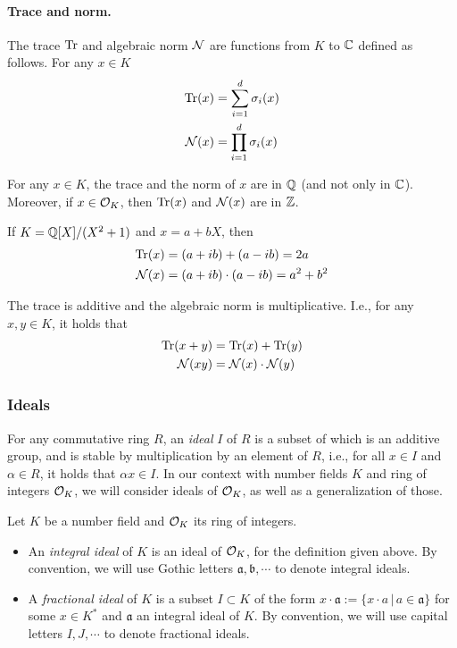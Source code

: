 \paragraph{Trace and norm.} The trace $\mathrm{Tr}$ and algebraic norm $\mathcal{N}$ are functions from $K$ to $\mathbb{C}$ defined as follows. For any $x \in K$
\begin{align*}
\mathrm{Tr}(x) &= \sum_{i = 1}^d \sigma_i(x) \\
\mathcal{N}(x) &= \prod_{i = 1}^d \sigma_i(x)
\end{align*}
\begin{lemma}
For any $x \in K$, the trace and the norm of $x$ are in $\mathbb{Q}$ (and not only in $\mathbb{C}$). Moreover, if $x \in \mathcal{O}_K$, then $\mathrm{Tr}(x)$ and $\mathcal{N}(x)$ are in $\mathbb{Z}$.
\end{lemma}

\begin{example}
If $K = \mathbb{Q}[X]/(X^2+1)$ and $x = a+bX$, then
\begin{align*}
\mathrm{Tr}(x) &= (a+ib) + (a-ib) = 2a \\
\mathcal{N}(x) &= (a+ib) \cdot (a-ib) = a^2+b^2
\end{align*}
\end{example}

\begin{lemma}
The trace is additive and the algebraic norm is multiplicative. I.e., for any $x, y \in K$, it holds that
\begin{align*}
\mathrm{Tr}(x+y) &= \mathrm{Tr}(x) + \mathrm{Tr}(y) \\
\mathcal{N}(xy) &= \mathcal{N}(x) \cdot \mathcal{N}(y)
\end{align*}
\end{lemma}

\subsubsection{Ideals} For any commutative ring $R$, an \emph{ideal} $I$ of $R$ is a subset of which is an additive group, and is stable by multiplication by an element of $R$, i.e., for all $x \in I$ and $\alpha \in R$, it holds that $\alpha x \in I$. In our context with number fields $K$ and ring of integers $\mathcal{O}_K$, we will consider ideals of $\mathcal{O}_K$, as well as a generalization of those.

\begin{definition}
Let $K$ be a number field and $\mathcal{O}_K$ its ring of integers.
\begin{itemize}
\item An \emph{integral ideal} of $K$ is an ideal of $\mathcal{O}_K$, for the definition given above. By convention, we will use Gothic letters $\mathfrak{a}, \mathfrak{b}, \cdots$ to denote integral ideals.
\item A \emph{fractional ideal} of $K$ is a subset $I \subset K$ of the form $x \cdot \mathfrak{a} := \{x \cdot a\,|\, a \in \mathfrak{a}\}$ for some $x \in K^*$ and $\mathfrak{a}$ an integral ideal of $K$. By convention, we will use capital letters $I, J, \cdots$ to denote fractional ideals.
\end{itemize}
\end{definition}

